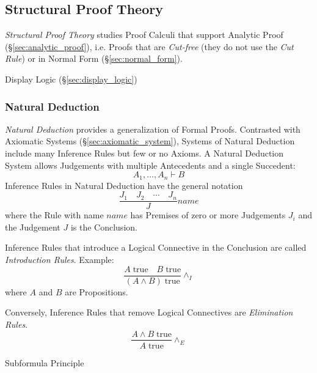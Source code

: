 \subsection{Structural Proof Theory}\label{sec:structural_proof}

\emph{Structural Proof Theory} studies Proof Calculi that support
Analytic Proof (\S\ref{sec:analytic_proof}), i.e. Proofs that are
\emph{Cut-free} (they do not use the \emph{Cut Rule}) or in Normal
Form (\S\ref{sec:normal_form}).

\fist Display Logic (\S\ref{sec:display_logic})



\subsubsection{Natural Deduction}\label{sec:natural_deduction}
\cite{prawitz65}

\emph{Natural Deduction} provides a generalization of Formal Proofs.
Contrasted with Axiomatic Systems (\S\ref{sec:axiomatic_system}),
Systems of Natural Deduction include many Inference Rules but few or
no Axioms. A Natural Deduction System allows Judgements with multiple
Antecedents and a single Succedent:
\[
  A_1,\ldots,A_n \vdash B
\]
Inference Rules in Natural Deduction have the general notation
\[
  {
    \frac{J_1 \quad J_2 \quad \cdots \quad J_n}
    {J}
  } name
\]
where the Rule with name $name$ has Premises of zero or more
Judgements $J_i$ and the Judgement $J$ is the Conclusion.

Inference Rules that introduce a Logical Connective in the Conclusion
are called \emph{Introduction Rules}. Example:
\[
  {
    \frac{A\;\mathrm{true} \quad B\;\mathrm{true}}
    {(A \wedge B)\;\mathrm{true}}
  } \wedge_I
\]
where $A$ and $B$ are Propositions.

Conversely, Inference Rules that remove Logical Connectives are
\emph{Elimination Rules}.
\[
  {
    \frac{A \wedge B\;\mathrm{true}}
    {A\;\mathrm{true}}
  } \wedge_E
\]

Subformula Principle

